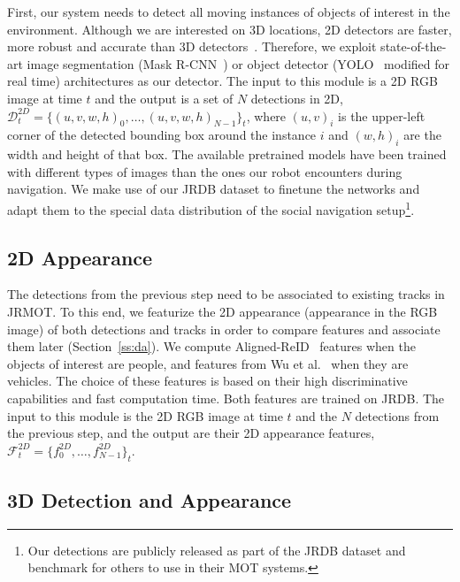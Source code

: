 \documentclass[letterpaper, 10 pt, conference]{ieeeconf}
\newcommand{\jrdb}{JRDB\xspace}
\newcommand{\methodname}{{JRMOT}\xspace}
\begin{document}
First, our system needs to detect all moving instances of objects of interest in the environment. Although we are interested on 3D locations, 2D detectors are faster, more robust and accurate than 3D detectors~\cite{8621614}. Therefore, we exploit state-of-the-art image segmentation (Mask R-CNN~\cite{he2017mask}) or object detector (YOLO~\cite{redmon2016you} modified for real time) architectures as our detector. 
The input to this module is a 2D RGB image at time $t$ and the output is a set of $N$ detections in 2D, $\mathcal{D}^{2D}_t = \{(u,v,w,h)_{0},\ldots,(u,v,w,h)_{N-1}\}_t$, where $(u,v)_i$ is the upper-left corner of the detected bounding box around the instance $i$ and $(w,h)_i$ are the width and height of that box. 
The available pretrained models have been trained with different types of images than the ones our robot encounters during navigation. We make use of our \jrdb dataset to finetune the networks and adapt them to the special data distribution of the social navigation setup\footnote{Our detections are publicly released as part of the \jrdb dataset and benchmark for others to use in their MOT systems.}. 

\subsection{2D Appearance}
\label{ss:appmod}

The detections from the previous step need to be associated to existing tracks in \methodname. To this end, we featurize the 2D appearance (appearance in the RGB image) of both detections and tracks in order to compare features and associate them later (Section~\ref{ss:da}).
We compute Aligned-ReID~\cite{zhang2017alignedreid} features when the objects of interest are people, and features from Wu et al.~\cite{wu2018vehicle} when they are vehicles. The choice of these features is based on their high discriminative capabilities and fast computation time.
Both features are trained on \jrdb.
The input to this module is the 2D RGB image at time $t$ and the $N$ detections from the previous step, and the output are their 2D appearance features, $\mathcal{F}^{2D}_t = \{f^{2D}_{0},\ldots,f^{2D}_{N-1}\}_t$.


\subsection{3D Detection and Appearance}
\label{ss:3Ddetections}
\end{document}
